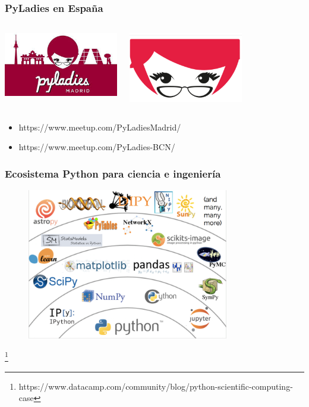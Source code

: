 \documentclass[18pt]{beamer}
\newcommand\blfootnote[1]{%
  \begingroup
  \renewcommand\thefootnote{}\footnote{#1}%
  \addtocounter{footnote}{-1}%
  \endgroup
}
\begin{document}
\begin{frame}

	\frametitle{PyLadies en España}
		
	\begin{columns}
		\centering
			\includegraphics[width=5cm]{images/pyladies_madrid.jpeg}\\
			\vspace{1cm}
			
		\centering
			\includegraphics[width=5cm]{images/pyladies_barcelona.png}
			\vspace{1cm}		
	\end{columns}
	
	\begin{itemize}	
		\setlength\itemsep{0.6em}
		\item https://www.meetup.com/PyLadiesMadrid/ 	
		\item https://www.meetup.com/PyLadies-BCN/ 
	\end{itemize}
	
\end{frame}


\begin{frame}

	\frametitle{Ecosistema Python para ciencia e ingeniería}
	
	\begin{figure}
		\includegraphics[width=8.8cm]{images/python_ecosystem.png}
	\end{figure}
	
	\blfootnote{\scriptsize https://www.datacamp.com/community/blog/python-scientific-computing-case}
	
\end{frame}
\end{document}
